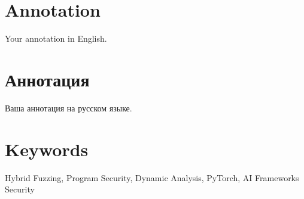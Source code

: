 \documentclass[a4paper,14pt]{extarticle}
\begin{document}
\newpage

{
	\hypersetup{linkcolor=black}
	\tableofcontents
}

\newpage
\section*{Annotation}

Your annotation in English.

\section*{\foreignlanguage{russian}{Аннотация}} %
\foreignlanguage{russian}{
	Ваша аннотация на русском языке.
}

\section*{Keywords}
Hybrid Fuzzing, Program Security, Dynamic Analysis, PyTorch, AI Frameworks Security
\pagebreak













\newpage

\printbibliography[heading=bibintoc]   %
\end{document}
